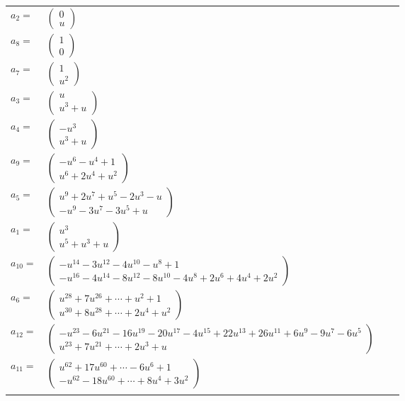 \documentclass[1p]{elsarticle_modified}
\theoremstyle{definition}
\begin{document}
\begin{tabular}{m{7pt} m{180pt} m{7pt} m{180pt} }
\flushright $a_{2}=$&$\begin{pmatrix}0\\u\end{pmatrix}$ \\
\flushright $a_{8}=$&$\begin{pmatrix}1\\0\end{pmatrix}$ \\
\flushright $a_{7}=$&$\begin{pmatrix}1\\u^2\end{pmatrix}$ \\
\flushright $a_{3}=$&$\begin{pmatrix}u\\u^3+u\end{pmatrix}$ \\
\flushright $a_{4}=$&$\begin{pmatrix}- u^3\\u^3+u\end{pmatrix}$ \\
\flushright $a_{9}=$&$\begin{pmatrix}- u^6- u^4+1\\u^6+2 u^4+u^2\end{pmatrix}$ \\
\flushright $a_{5}=$&$\begin{pmatrix}u^9+2 u^7+u^5-2 u^3- u\\- u^9-3 u^7-3 u^5+u\end{pmatrix}$ \\
\flushright $a_{1}=$&$\begin{pmatrix}u^3\\u^5+u^3+u\end{pmatrix}$ \\
\flushright $a_{10}=$&$\begin{pmatrix}- u^{14}-3 u^{12}-4 u^{10}- u^8+1\\- u^{16}-4 u^{14}-8 u^{12}-8 u^{10}-4 u^8+2 u^6+4 u^4+2 u^2\end{pmatrix}$ \\
\flushright $a_{6}=$&$\begin{pmatrix}u^{28}+7 u^{26}+\cdots+u^2+1\\u^{30}+8 u^{28}+\cdots+2 u^4+u^2\end{pmatrix}$ \\
\flushright $a_{12}=$&$\begin{pmatrix}- u^{23}-6 u^{21}-16 u^{19}-20 u^{17}-4 u^{15}+22 u^{13}+26 u^{11}+6 u^9-9 u^7-6 u^5\\u^{23}+7 u^{21}+\cdots+2 u^3+u\end{pmatrix}$ \\
\flushright $a_{11}=$&$\begin{pmatrix}u^{62}+17 u^{60}+\cdots-6 u^6+1\\- u^{62}-18 u^{60}+\cdots+8 u^4+3 u^2\end{pmatrix}$\\&\end{tabular}
\end{document}
